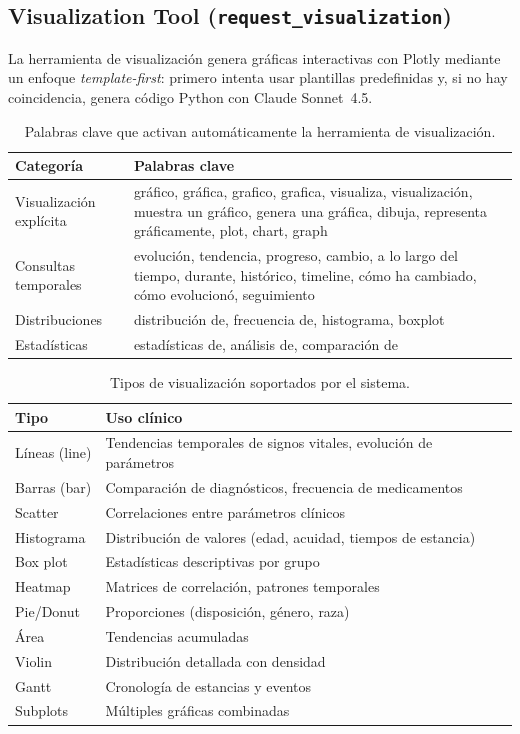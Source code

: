 ﻿\documentclass[11pt,a4paper]{article}
\begin{document}
\subsection{Visualization Tool (\texttt{request\_visualization})}

La herramienta de visualizaci\'on genera gr\'aficas interactivas con Plotly mediante un enfoque \textit{template-first}: primero intenta usar plantillas predefinidas y, si no hay coincidencia, genera c\'odigo Python con Claude Sonnet~4.5.

\begin{table}[H]
\centering
\caption{Palabras clave que activan autom\'aticamente la herramienta de visualizaci\'on.}
\label{tab:vizkeywords}
\begin{tabularx}{\textwidth}{lX}
\toprule
\textbf{Categor\'ia} & \textbf{Palabras clave} \\
\midrule
Visualizaci\'on expl\'icita & gr\'afico, gr\'afica, grafico, grafica, visualiza, visualizaci\'on, muestra un gr\'afico, genera una gr\'afica, dibuja, representa gr\'aficamente, plot, chart, graph \\
Consultas temporales & evoluci\'on, tendencia, progreso, cambio, a lo largo del tiempo, durante, hist\'orico, timeline, c\'omo ha cambiado, c\'omo evolucion\'o, seguimiento \\
Distribuciones & distribuci\'on de, frecuencia de, histograma, boxplot \\
Estad\'isticas & estad\'isticas de, an\'alisis de, comparaci\'on de \\
\bottomrule
\end{tabularx}
\end{table}

\begin{table}[H]
\centering
\caption{Tipos de visualizaci\'on soportados por el sistema.}
\label{tab:viztypes}
\begin{tabularx}{\textwidth}{lX}
\toprule
\textbf{Tipo} & \textbf{Uso cl\'inico} \\
\midrule
L\'ineas (line) & Tendencias temporales de signos vitales, evoluci\'on de par\'ametros \\
Barras (bar) & Comparaci\'on de diagn\'osticos, frecuencia de medicamentos \\
Scatter & Correlaciones entre par\'ametros cl\'inicos \\
Histograma & Distribuci\'on de valores (edad, acuidad, tiempos de estancia) \\
Box plot & Estad\'isticas descriptivas por grupo \\
Heatmap & Matrices de correlaci\'on, patrones temporales \\
Pie/Donut & Proporciones (disposici\'on, g\'enero, raza) \\
\'Area & Tendencias acumuladas \\
Violin & Distribuci\'on detallada con densidad \\
Gantt & Cronolog\'ia de estancias y eventos \\
Subplots & M\'ultiples gr\'aficas combinadas \\
\bottomrule
\end{tabularx}
\end{table}
\end{document}
